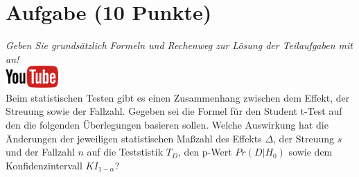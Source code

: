 \documentclass[a4paper, 9pt]{scrartcl}\usepackage[]{graphicx}\usepackage[]{xcolor}
\begin{document}
 
\clearpage

\section{Aufgabe \hfill (10 Punkte)}

\textit{Geben Sie grunds{\"a}tzlich Formeln und Rechenweg zur L{\"o}sung der
  Teilaufgaben mit an!} \\[1Ex]

\hfill\href{https://youtu.be/FgZmpnEWDag}{\includegraphics[width =
  2cm]{img/youtube}}\\[1Ex]



Beim statistischen Testen gibt es einen Zusammenhang zwischen dem Effekt,
der Streuung sowie der Fallzahl. Gegeben sei die Formel f{\"u}r den Student
t-Test auf den die folgenden {\"U}berlegungen basieren sollen. Welche
Auswirkung hat die {\"A}nderungen der jeweiligen statistischen Ma{\ss}zahl des
Effekts $\Delta$, der Streuung $s$ und der Fallzahl $n$ auf die Teststistik
$T_{D}$, den p-Wert $Pr(D|H_0)$ sowie dem Konfidenzintervall
$KI_{1-\alpha}$?
\end{document}

